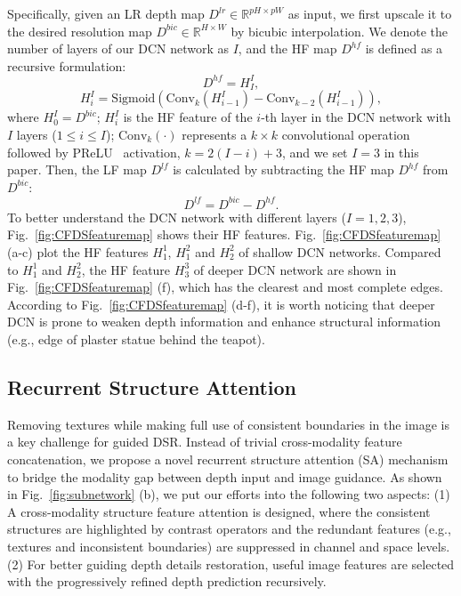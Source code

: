 \documentclass[letterpaper]{article} %
\begin{document}
Specifically, given an LR depth map $D^{lr}\in \mathbb{R}^{pH\times pW}$ as input, we first upscale it to the desired resolution map $D^{bic}\in \mathbb{R}^{H\times W}$ by bicubic interpolation. We denote the number of layers of our DCN network as $I$, and the HF map $D^{hf}$ is defined as a recursive formulation:
\begin{equation}
D^{hf}=H_{I}^I,
\end{equation}
\begin{equation}
 H_{i}^I=\text{Sigmoid}\left( \text{Conv}_{k} (H_{i-1}^I)-\text{Conv}_{k-2}(H_{i-1}^I) \right),
\end{equation}
where $H_0^I=D^{bic}$; $H_{i}^I$ is the HF feature of the $i$-th layer in the DCN network with $I$ layers ($1\leq i\leq I$); $\text{Conv}_{k}(\cdot)$ represents a $k\times k$ convolutional operation followed by PReLU~\cite{he2015delving} activation, $k =2(I-i)+3$, and we set $I=3$ in this paper. Then, the LF map $D^{lf}$ is calculated by subtracting the HF map $D^{hf}$ from $D^{bic}$:
\begin{equation}
   	 D^{lf}=  D^{bic}-D^{hf}.
\end{equation}
To better understand the DCN network with different layers ($I=1,2,3$), Fig.~\ref{fig:CFDSfeaturemap} shows their HF features. Fig.~\ref{fig:CFDSfeaturemap} (a-c) plot the HF features $H_{1}^1$, $H_{1}^2$ and $H_{2}^2$ of shallow DCN networks. Compared to $H_{1}^1$ and $H_{2}^2$, the HF feature $H_{3}^3$ of deeper DCN network are shown in Fig.~\ref{fig:CFDSfeaturemap} (f), which has the clearest and most complete edges.  According to Fig.~\ref{fig:CFDSfeaturemap} (d-f), it is worth noticing that deeper DCN is prone to weaken depth information and enhance structural information (e.g., edge of plaster statue behind the teapot).



 \subsection{Recurrent Structure Attention}
 \label{sec:CS}

Removing textures while making full use of consistent boundaries in the image is a key challenge for guided DSR. Instead of trivial cross-modality feature concatenation, we propose a novel recurrent structure attention (SA) mechanism to bridge the modality gap between depth input and image guidance.
As shown in Fig.~\ref{fig:subnetwork} (b), we put our efforts into the following two aspects:
(1) A cross-modality structure feature attention is designed, where the consistent structures are highlighted by contrast operators and the redundant features (e.g., textures and inconsistent boundaries) are suppressed in channel and space levels.
(2) For better guiding depth details restoration, useful image features are selected with the progressively refined depth prediction recursively.
\end{document}
